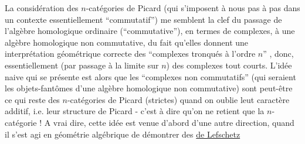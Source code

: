  La considération des $n$-catégories de Picard  (qui s'imposent à nous pas
à pas dans un contexte essentiellement ``commutatif'') me semblent la clef du
passage de l'algèbre homologique ordinaire (``commutative''), en termes de
complexes, à une algèbre homologique non commutative, du fait qu'elles
donnent une interprétation géométrique correcte des ``complexes tronqués à
l'ordre $n$'' , donc, essentiellement (par passage à la limite sur $n$) des
complexes tout courts. L'idée naive qui se présente est alors que les
``complexes non commutatifs'' (qui seraient les objets-fantômes d'une algèbre
homologique non commutative) sont peut-être ce qui reste des $n$-catégories
de Picard (strictes) quand on oublie leut caractère additif, i.e. leur
structure de Picard - c'est à dire qu'on ne retient que la $n$-catégorie !
A vrai dire, cette idée est venue d'abord d'une autre direction, quand il
s'est agi en géométrie algébrique de démontrer des \uline{ de Lefschetz}

